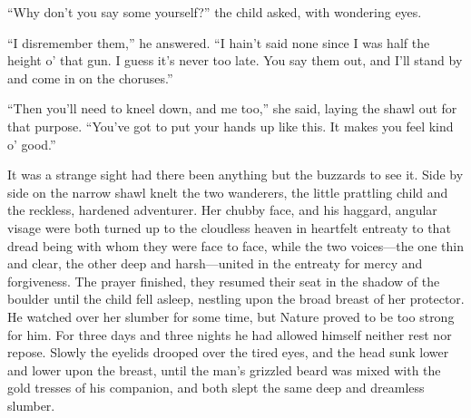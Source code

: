 \documentclass[12pt]{book}
\begin{document}
“Why don’t you say some yourself?” the child asked, with wondering eyes. 

“I disremember them,” he answered. “I hain’t said none since I was half the height o’ that gun. I guess it’s never too late. You say them out, and I’ll stand by and come in on the choruses.” 

“Then you’ll need to kneel down, and me too,” she said, laying the shawl out for that purpose. “You’ve got to put your hands up like this. It makes you feel kind o’ good.” 

It was a strange sight had there been anything but the buzzards to see it. Side by side on the narrow shawl knelt the two wanderers, the little prattling child and the reckless, hardened adventurer. Her chubby face, and his haggard, angular visage were both turned up to the cloudless heaven in heartfelt entreaty to that dread being with whom they were face to face, while the two voices—the one thin and clear, the other deep and harsh—united in the entreaty for mercy and forgiveness. The prayer finished, they resumed their seat in the shadow of the boulder until the child fell asleep, nestling upon the broad breast of her protector. He watched over her slumber for some time, but Nature proved to be too strong for him. For three days and three nights he had allowed himself neither rest nor repose. Slowly the eyelids drooped over the tired eyes, and the head sunk lower and lower upon the breast, until the man’s grizzled beard was mixed with the gold tresses of his companion, and both slept the same deep and dreamless slumber. 
\end{document}
